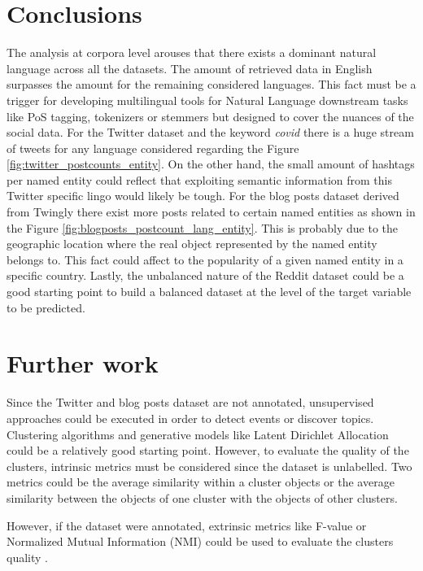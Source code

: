 \section{Conclusions}


The analysis at corpora level arouses that there exists a dominant natural language across all the datasets. The amount of retrieved data in English surpasses the amount for the remaining considered languages. This fact must be a trigger for developing multilingual tools for Natural Language downstream tasks like PoS tagging, tokenizers or stemmers but designed to cover the nuances of the social data. For the Twitter dataset and the keyword \textit{covid} there is a huge stream of tweets for any language considered regarding the Figure \ref{fig:twitter_postcounts_entity}. On the other hand, the small amount of hashtags per named entity could reflect that exploiting semantic information from this Twitter specific lingo would likely be tough. For the blog posts dataset derived from Twingly there exist more posts related to certain named entities as shown in the Figure \ref{fig:blogposts_postcount_lang_entity}. This is probably due to the geographic location where the real object represented by the named entity belongs to. This fact could affect to the popularity of a given named entity in a specific country. Lastly, the unbalanced nature of the Reddit dataset could be a good starting point to build a balanced dataset at the level of the target variable to be predicted.


\section{Further work}
Since the Twitter and blog posts dataset are not annotated, unsupervised approaches could be executed in order to detect events or discover topics. Clustering algorithms and generative models like Latent Dirichlet Allocation \citep{bleiLda} could be a relatively good starting point. However, to evaluate the quality of the clusters, intrinsic metrics must be considered since the dataset is unlabelled. Two metrics could be the average similarity within a cluster objects or the average similarity between the objects of one cluster with the objects of other clusters.


However, if the dataset were annotated, extrinsic metrics like F-value or Normalized Mutual Information (NMI) could be used to evaluate the clusters quality \citep{clusteringTopicModellingTwitterReddit}.
